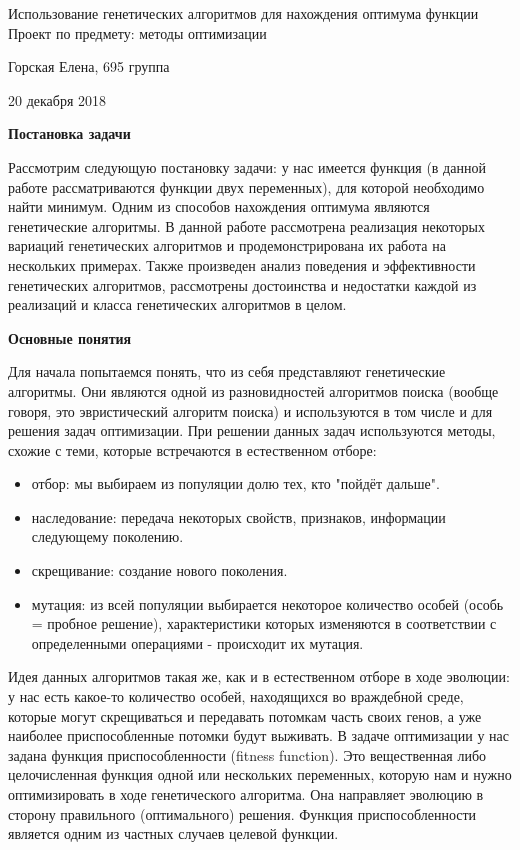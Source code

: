 \documentclass[a4paper,11pt,russian]{article}
\begin{document}
\begin{center}
\hfill \break
\LARGE{Использование генетических алгоритмов для нахождения оптимума функции}\\


\large{Проект по предмету: методы оптимизации}


\large{Горская Елена, 695 группа}

\large{20 декабря 2018}
\end{center} 
\hfill \break
\textbf{Постановка задачи}

Рассмотрим следующую постановку задачи: у нас имеется функция (в данной работе рассматриваются функции двух переменных), для которой необходимо найти минимум. Одним из способов нахождения оптимума являются генетические алгоритмы. В данной работе рассмотрена реализация некоторых вариаций генетических алгоритмов и продемонстрирована их работа на нескольких примерах. Также произведен анализ поведения и эффективности генетических алгоритмов, рассмотрены достоинства и недостатки каждой из реализаций и класса генетических алгоритмов в целом.

\hfill \break
\textbf{Основные понятия}

Для начала попытаемся понять, что из себя представляют генетические алгоритмы. Они являются одной из разновидностей алгоритмов поиска (вообще говоря, это эвристический алгоритм поиска) и используются в том числе и для решения задач оптимизации. При решении данных задач используются методы, схожие с теми, которые встречаются в естественном отборе:
\begin{itemize}
\item отбор: мы выбираем из популяции долю тех, кто "пойдёт дальше".
\item наследование: передача некоторых свойств, признаков, информации следующему поколению.
\item скрещивание: создание нового поколения.
\item мутация: из всей популяции выбирается некоторое количество особей (особь = пробное решение), характеристики которых изменяются в соответствии с определенными операциями - происходит их мутация.
\end{itemize}

Идея данных алгоритмов такая же, как и в естественном отборе в ходе эволюции: у нас есть какое-то количество особей, находящихся во враждебной среде, которые могут скрещиваться и передавать потомкам часть своих генов, а уже наиболее приспособленные потомки будут выживать. В задаче оптимизации у нас задана функция приспособленности (fitness function). Это вещественная либо целочисленная функция одной или нескольких переменных, которую нам и нужно оптимизировать в ходе генетического алгоритма. Она направляет эволюцию в сторону правильного (оптимального) решения. Функция приспособленности является одним из частных случаев целевой функции.
\end{document}
